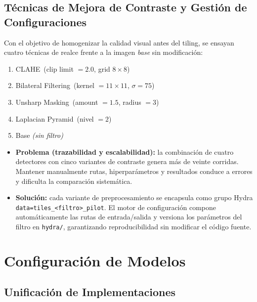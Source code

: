 \subsection{Técnicas de Mejora de Contraste y Gestión de Configuraciones}\label{ssec:contraste}

Con el objetivo de homogenizar la calidad visual antes del tiling, se ensayan cuatro técnicas de realce frente a la imagen \emph{base} sin modificación:

\begin{enumerate}
  \renewcommand{\labelenumi}{\alph{enumi})}
  \renewcommand{\theenumi}{\alph{enumi}}
  \item CLAHE \,(clip limit \(=2.0\), grid \(8\times8\))
  \item Bilateral Filtering \,(kernel \(=11\times11\), \(\sigma=75\))
  \item Unsharp Masking \,(amount \(=1.5\), radius \(=3\))
  \item Laplacian Pyramid \,(nivel \(=2\))
  \item Base \emph{(sin filtro)}
\end{enumerate}

\begin{itemize}
   \item \textbf{Problema (trazabilidad y escalabilidad):} la combinación de cuatro detectores con cinco variantes de contraste genera más de veinte corridas.
   Mantener manualmente rutas, hiperparámetros y resultados conduce a errores y dificulta la comparación sistemática.
   \item \textbf{Solución:} cada variante de preprocesamiento se encapsula como grupo Hydra \texttt{data=tiles\_<filtro>\_pilot}.
   El motor de configuración compone automáticamente las rutas de entrada/salida y versiona los parámetros del filtro en \texttt{hydra/}, garantizando reproducibilidad sin modificar el código fuente.
\end{itemize}

\section{Configuración de Modelos}\label{sec:modelos}

\subsection{Unificación de Implementaciones}\label{ssec:unify_impl}

